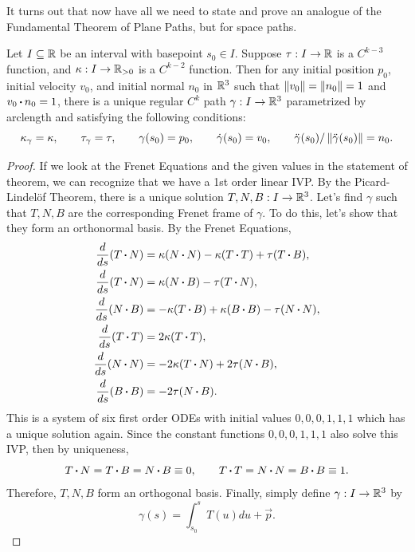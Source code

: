 It turns out that now have all we need to state and prove an analogue of the Fundamental Theorem of Plane Paths, but for space paths.

\begin{theorem}
    Let $I \subseteq \mathbb{R}$ be an interval with basepoint $s_0 \in I$. Suppose $\tau : I \to \mathbb{R}$ is a $C^{k - 3}$ function, and $\kappa : I \to \mathbb{R}_{> 0}$ is a $C^{k-2}$ function. Then for any initial position $p_0$, initial velocity $v_0$, and initial normal $n_0$ in $\mathbb{R}^3$ such that $\left\lVert v_0 \right\rVert = \left\lVert n_0 \right\rVert = 1$ and $v_0 \operatorname{\boldsymbol{\cdot}} n_0 = 1$, there is a unique regular $C^k$ path $\gamma : I \to \mathbb{R}^3$ parametrized by arclength and satisfying the following conditions:
    $$\kappa_\gamma = \kappa, \qquad \tau_\gamma = \tau, \qquad \gamma(s_0) = p_0, \qquad \dot\gamma(s_0) = v_0, \qquad \ddot\gamma(s_0)/\left\lVert\ddot\gamma(s_0) \right\rVert = n_0.$$
\end{theorem}

\begin{proof}
    If we look at the Frenet Equations and the given values in the statement of theorem, we can recognize that we have a 1st order linear IVP. By the Picard-Lindelöf Theorem, there is a unique solution $T,N,B : I \to \mathbb{R}^3$. Let's find $\gamma$ such that $T,N,B$ are the corresponding Frenet frame of $\gamma$. To do this, let's show that they form an orthonormal basis. By the Frenet Equations,
    \begin{align*}
        \frac{d}{ds}(T\operatorname{\boldsymbol{\cdot}} N) &= \kappa(N \operatorname{\boldsymbol{\cdot}} N) - \kappa(T\operatorname{\boldsymbol{\cdot}} T) + \tau(T \operatorname{\boldsymbol{\cdot}} B), \\
        \frac{d}{ds}(T\operatorname{\boldsymbol{\cdot}} N) &= \kappa(N \operatorname{\boldsymbol{\cdot}} B) - \tau(T\operatorname{\boldsymbol{\cdot}} N), \\
        \frac{d}{ds}(N\operatorname{\boldsymbol{\cdot}} B) &= -\kappa(T \operatorname{\boldsymbol{\cdot}} B) + \kappa(B\operatorname{\boldsymbol{\cdot}} B) - \tau(N \operatorname{\boldsymbol{\cdot}} N), \\
        \frac{d}{ds}(T\operatorname{\boldsymbol{\cdot}} T) &= 2\kappa(T\operatorname{\boldsymbol{\cdot}} T), \\
        \frac{d}{ds}(N\operatorname{\boldsymbol{\cdot}} N) &= -2\kappa (T \operatorname{\boldsymbol{\cdot}} N) + 2\tau(N \operatorname{\boldsymbol{\cdot}} B), \\
        \frac{d}{ds}(B\operatorname{\boldsymbol{\cdot}} B) &= -2\tau (N\operatorname{\boldsymbol{\cdot}} B).
    \end{align*} 
    This is a system of six first order ODEs with initial values $0,0,0,1,1,1$ which has a unique solution again. Since the constant functions $0,0,0,1,1,1$ also solve this IVP, then by uniqueness, 
    $$T\operatorname{\boldsymbol{\cdot}} N = T \operatorname{\boldsymbol{\cdot}} B = N\operatorname{\boldsymbol{\cdot}} B \equiv 0, \qquad T\operatorname{\boldsymbol{\cdot}} T = N \operatorname{\boldsymbol{\cdot}} N = B \operatorname{\boldsymbol{\cdot}} B \equiv 1.$$
    Therefore, $T,N,B$ form an orthogonal basis. Finally, simply define $\gamma : I \to \mathbb{R}^3$ by
    $$\gamma(s) = \int_{s_0}^{s}T(u)du + \vec{p}.$$
\end{proof}

